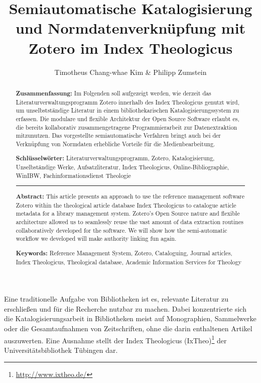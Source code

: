 \documentclass[a4paper,
fontsize=11pt,
oneside,
numbers=noperiodatend,
parskip=half-,
bibliography=totoc,
final
]{scrartcl}
\title{\LARGE{Semiautomatische Katalogisierung und Normdatenverknüpfung mit Zotero im Index Theologicus}} %
\author{Timotheus Chang-whae Kim \& Philipp Zumstein} %
\date{}
\begin{document}
\maketitle
\thispagestyle{fancyplain} 

\begin{abstract}
\small
\textbf{Zusammenfassung:} Im Folgenden soll aufgezeigt werden, wie
derzeit das Literaturverwaltungsprogramm Zotero innerhalb des Index
Theologicus genutzt wird, um unselbstständige Literatur in einem
bibliothekarischen Katalogisierungssystem zu erfassen. Die modulare und
flexible Architektur der Open Source Software erlaubt es, die bereits
kollaborativ zusammengetragene Programmierarbeit zur Datenextraktion
mitzunutzen. Das vorgestellte semiautomatische Verfahren bringt auch bei
der Verknüpfung von Normdaten erhebliche Vorteile für die
Medienbearbeitung.

\textbf{Schlüsselwörter:} Literaturverwaltungsprogramm, Zotero,
Katalogisierung, Unselbständige Werke, Aufsatzliteratur, Index
Theologicus, Online-Bibliographie, WinIBW, Fachinformationsdienst
Theologie

\begin{center}\rule{0.5\linewidth}{\linethickness}\end{center}

\textbf{Abstract:} This article presents an approach to use the
reference management software Zotero within the theological article
database Index Theologicus to catalogue article metadata for a library
management system. Zotero's Open Source nature and flexible architecture
allowed us to seamlessly reuse the vast amount of data extraction
routines collaboratively developed for the software. We will show how
the semi-automatic workflow we developed will make authority linking fun
again.

\textbf{Keywords:} Reference Management System, Zotero, Cataloguing,
Journal articles, Index Theologicus, Theological database, Academic
Information Services for Theology
\end{abstract}

Eine traditionelle Aufgabe von Bibliotheken ist es, relevante Literatur
zu erschließen und für die Recherche nutzbar zu machen. Dabei
konzentrierte sich die Katalogisierungsarbeit in Bibliotheken meist auf
Monographien, Sammelwerke oder die Gesamtaufnahmen von Zeitschriften,
ohne die darin enthaltenen Artikel auszuwerten. Eine Ausnahme stellt der
Index Theologicus (IxTheo)\footnote{\url{http://www.ixtheo.de/}} der
Universitätsbibliothek Tübingen dar.
\end{document}
